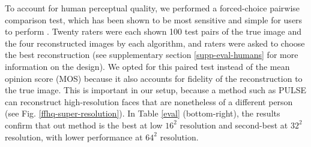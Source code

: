 \documentclass{article}
\begin{document}
To account for human perceptual quality, we performed a forced-choice pairwise comparison test, which has been shown to be most sensitive and simple for users to perform \cite{mantiuk2012comparison}. Twenty raters were each shown 100 test pairs of the true image and the four reconstructed images by each algorithm, and raters were asked to choose the best reconstruction (see supplementary section \ref{supp-eval-humans} for more information on the design). We opted for this paired test instead of the mean opinion score (MOS) because it also accounts for fidelity of the reconstruction to the true image. This is important in our setup, because a method such as PULSE can reconstruct high-resolution faces that are nonetheless of a different person (see Fig. \ref{ffhq-super-resolution}). In Table \ref{eval} (bottom-right), the results confirm that out method is the best at low $16^2$ resolution and second-best at $32^2$ resolution, with lower performance at $64^2$ resolution. 



\newcommand{\tb}[1]{\textbf{#1}}
\newcommand{\lpi}{\multicolumn{1}{c}{\small LPIPS$\downarrow$}}
\newcommand{\rms}{\multicolumn{1}{c}{\small RMSE$\downarrow$}}
\end{document}
